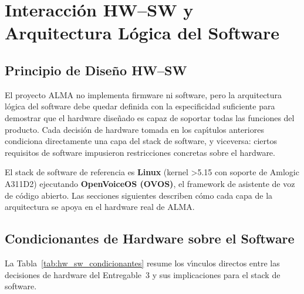 \chapter{Interacci\'{o}n HW--SW y Arquitectura L\'{o}gica del Software}
\label{chap:hw_sw}

\section{Principio de Dise\~{n}o HW--SW}
\label{sec:hwsw_principio}

El proyecto ALMA no implementa firmware ni software, pero la arquitectura
l\'{o}gica del software debe quedar definida con la especificidad suficiente
para demostrar que el hardware dise\~{n}ado es capaz de soportar todas las
funciones del producto. Cada decisi\'{o}n de hardware tomada en los
cap\'{\i}tulos anteriores condiciona directamente una capa del stack de software,
y viceversa: ciertos requisitos de software impusieron restricciones concretas
sobre el hardware.

El stack de software de referencia es \textbf{Linux} (kernel \textgreater{}5.15
con soporte de Amlogic A311D2) ejecutando \textbf{OpenVoiceOS (OVOS)}, el
framework de asistente de voz de c\'{o}digo abierto. Las secciones siguientes
describen c\'{o}mo cada capa de la arquitectura se apoya en el hardware
real de ALMA.

\section{Condicionantes de Hardware sobre el Software}
\label{sec:hwsw_hw_condiciones}

La Tabla~\ref{tab:hw_sw_condicionantes} resume los v\'{\i}nculos directos
entre las decisiones de hardware del Entregable~3 y sus implicaciones para
el stack de software.

